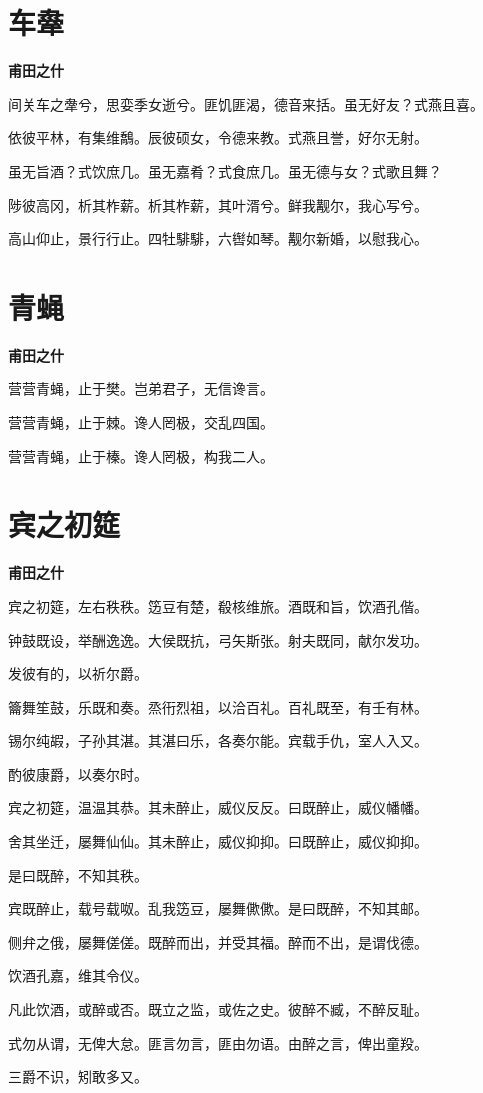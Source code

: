 \documentclass[12pt,a4paper]{ctexbook}
\begin{document}
\section{车舝}
\textbf{甫田之什}\par\vspace{0.5em}
间关车之舝兮，思娈季女逝兮。匪饥匪渴，德音来括。虽无好友？式燕且喜。\par
依彼平林，有集维鷮。辰彼硕女，令德来教。式燕且誉，好尔无射。\par
虽无旨酒？式饮庶几。虽无嘉肴？式食庶几。虽无德与女？式歌且舞？\par
陟彼高冈，析其柞薪。析其柞薪，其叶湑兮。鲜我觏尔，我心写兮。\par
高山仰止，景行行止。四牡騑騑，六辔如琴。觏尔新婚，以慰我心。\par

\section{青蝇}
\textbf{甫田之什}\par\vspace{0.5em}
营营青蝇，止于樊。岂弟君子，无信谗言。\par
营营青蝇，止于棘。谗人罔极，交乱四国。\par
营营青蝇，止于榛。谗人罔极，构我二人。\par

\section{宾之初筵}
\textbf{甫田之什}\par\vspace{0.5em}
宾之初筵，左右秩秩。笾豆有楚，殽核维旅。酒既和旨，饮酒孔偕。\par
钟鼓既设，举酬逸逸。大侯既抗，弓矢斯张。射夫既同，献尔发功。\par
发彼有的，以祈尔爵。\par
籥舞笙鼓，乐既和奏。烝衎烈祖，以洽百礼。百礼既至，有壬有林。\par
锡尔纯嘏，子孙其湛。其湛曰乐，各奏尔能。宾载手仇，室人入又。\par
酌彼康爵，以奏尔时。\par
宾之初筵，温温其恭。其未醉止，威仪反反。曰既醉止，威仪幡幡。\par
舍其坐迁，屡舞仙仙。其未醉止，威仪抑抑。曰既醉止，威仪抑抑。\par
是曰既醉，不知其秩。\par
宾既醉止，载号载呶。乱我笾豆，屡舞僛僛。是曰既醉，不知其邮。\par
侧弁之俄，屡舞傞傞。既醉而出，并受其福。醉而不出，是谓伐德。\par
饮酒孔嘉，维其令仪。\par
凡此饮酒，或醉或否。既立之监，或佐之史。彼醉不臧，不醉反耻。\par
式勿从谓，无俾大怠。匪言勿言，匪由勿语。由醉之言，俾出童羖。\par
三爵不识，矧敢多又。\par
\end{document}
